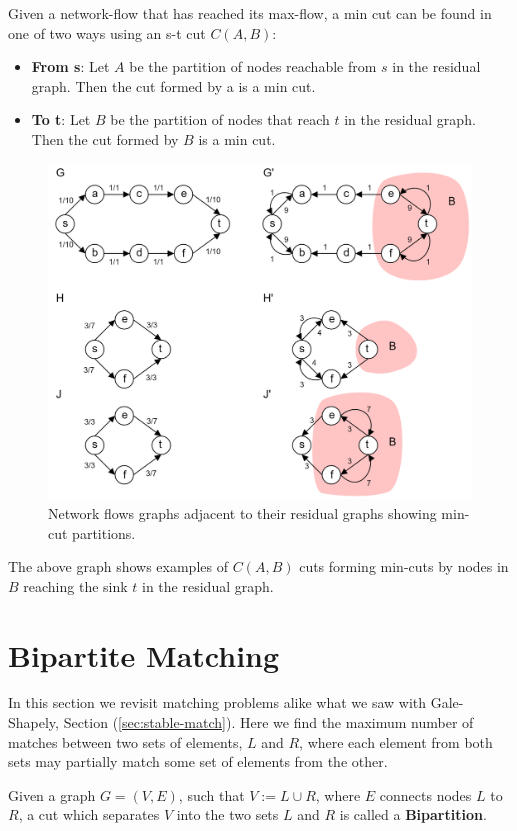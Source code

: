 \begin{theo}
    
        Given a network-flow that has reached its max-flow, a min cut can be found in one of two ways using an s-t cut $C(A,B)$:
        \begin{itemize}
            \item \textbf{From s}: Let $A$ be the partition of nodes reachable from $s$ in the residual graph. Then the cut formed by a is a min cut.
            \item \textbf{To t}: Let $B$ be the partition of nodes that reach $t$ in the residual graph. Then the cut formed by $B$ is a min cut.
        \end{itemize}
\end{theo}
\begin{figure}[h!]
    \centering
    \includegraphics[width=1\textwidth]{Sections/net/tot.png}
    \caption{Network flows graphs adjacent to their residual graphs showing min-cut partitions.}
    \label{fig:tot}
\end{figure}

\noindent
The above graph shows examples of $C(A,B)$ cuts forming min-cuts by nodes in $B$ reaching the sink $t$ in the residual graph.

\newpage
\section{Bipartite Matching}
In this section we revisit matching problems alike what we saw with Gale-Shapely, Section (\ref{sec:stable-match}). Here we find
the maximum number of matches between two sets of elements, $L$ and $R$, where each element from both sets may partially match some 
set of elements from the other.
\begin{Def}

    Given a graph $G=(V, E)$, such that $V:=L\cup R$, where $E$ connects nodes $L$ to $R$,
    a cut which separates $V$ into the two sets $L$ and $R$ is called a \textbf{Bipartition}. 
\end{Def}

